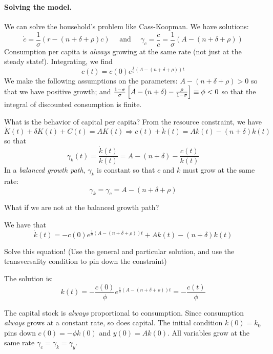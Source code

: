 \documentclass[10pt]{article}
\begin{document}
\paragraph{Solving the model.} We can solve the household's problem like Cass-Koopman. We have solutions:
\[
\dot{c} = \frac{1}{\sigma} (r - (n + \delta + \rho)c) \quad \text{ and } \quad \gamma_c = \frac{\dot{c}}{c} = \frac{1}{\sigma}(A - (n + \delta + \rho))
\]
Consumption per capita is \emph{always} growing at the same rate (not just at the steady state!). Integrating, we find
\[
c(t) = c(0) e^{\frac{1}{\sigma}(A - (n + \delta + \rho))t}
\]
We make the following assumptions on the parameters: $A - (n + \delta + \rho) > 0$ so that we have positive growth; and $\frac{1-\sigma}{\sigma}\left[ A - (n + \delta) - \frac{\rho}{1-\sigma}\right] \equiv \phi < 0$ so that the integral of discounted consumption is finite.

What is the behavior of capital per capita? From the resource constraint, we have
\[
\dot{K}(t) + \delta K(t) + C(t) = AK(t) \Longrightarrow c(t) + \dot{k}(t) = Ak(t) - (n+\delta)k(t)
\]
so that
\[
\gamma_k(t) = \frac{\dot{k}(t)}{k(t)} = A - (n + \delta) - \frac{c(t)}{k(t)}
\]
In a \emph{balanced growth path}, $\gamma_k$ is constant so that $c$ and $k$ must grow at the same rate:
\[
\gamma_k = \gamma_c = A - (n + \delta + \rho)
\]

\begin{question}
	What if we are not at the balanced growth path?
\end{question}

We have that
\[
\dot{k}(t) = -c(0) e^{\frac{1}{\sigma}(A - (n + \delta + \rho))t} + Ak(t) - (n + \delta)k(t)
\]

\begin{exercise}
	Solve this equation! (Use the general and particular solution, and use the transversality condition to pin down the constraint)
\end{exercise}

\begin{solution}
	The solution is:
	\[
	k(t) = -\frac{c(0)}{\phi} e^{\frac{1}{\sigma}(A - (n + \delta + \rho))t} = -\frac{c(t)}{\phi}
	\]
\end{solution}

\begin{remark}
	The capital stock is \emph{always} proportional to consumption. Since consumption \emph{always} grows at a constant rate, so does capital. The initial condition $k(0) = k_0$ pins down $c(0) = -\phi k(0)$ and $y(0) = Ak(0)$. All variables grow at the same rate $\gamma_c = \gamma_k = \gamma_y$.
\end{remark}
\end{document}
